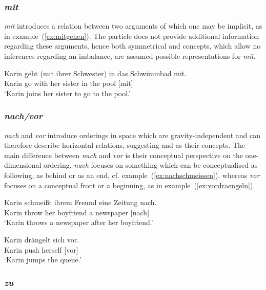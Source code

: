 \documentclass[output=paper]{langsci/langscibook}
\begin{document}
\vspace{+1mm}
\subsubsection{\textit{mit}}

\textit{mit} introduces a relation between two arguments of which one
may be implicit, as in example~(\ref{ex:mitgehen}). The particle does
not provide additional information regarding these arguments, hence
both symmetrical  and  concepts,
which allow no inferences regarding an imbalance, are assumed possible
representations for \textit{mit}.

\ea\label{ex:mitgehen}
\gll Karin geht (mit ihrer Schwester) in das Schwimmbad mit.\\
Karin go with her sister in the pool [mit]\\
\glt `Karin joins her sister to go to the pool.'
\z

\vspace{+1mm}
\subsubsection{\textit{nach/vor}}

\textit{nach} and \textit{vor} introduce orderings in space which are
gravity-independent and can therefore describe horizontal relations,
suggesting  and  as their
concepts. The main difference between \textit{nach} and \textit{vor}
is their conceptual perspective on the one-dimensional
ordering. \textit{nach} focuses on something which can be
conceptualised as following, as behind or as an end, cf.
example~(\ref{ex:nachschmeissen}), whereas \textit{vor} focuses on a
conceptual front or a beginning, as in
example~(\ref{ex:vordraengeln}).

\ea\label{ex:nachschmeissen}
\gll Karin schmeißt ihrem Freund eine Zeitung nach.\\
Karin throw her boyfriend a newspaper [nach]\\
\glt `Karin throws a newspaper after her boyfriend.' 
\z

\ea\label{ex:vordraengeln}
\gll Karin drängelt sich vor.\\
Karin push herself [vor]\\
\glt `Karin jumps the queue.'
\z

\vspace{+1mm}
\subsubsection{\textit{zu}}
\end{document}
